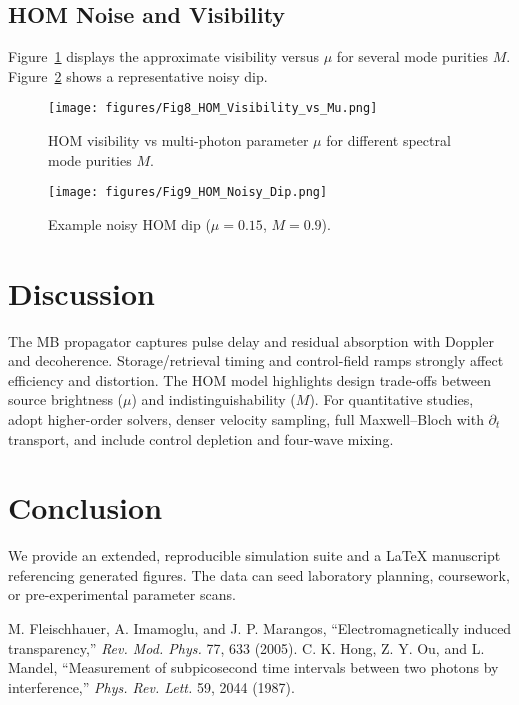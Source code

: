 \documentclass[11pt]{article}
\begin{document}
\subsection{HOM Noise and Visibility}
Figure~\ref{fig:hom_vis} displays the approximate visibility versus $\mu$ for several mode purities $M$. Figure~\ref{fig:hom_noisy} shows a representative noisy dip.

\begin{figure}[h]
\centering
\texttt{[image: figures/Fig8\_HOM\_Visibility\_vs\_Mu.png]}
\caption{HOM visibility vs multi-photon parameter $\mu$ for different spectral mode purities $M$.}
\label{fig:hom_vis}
\end{figure}

\begin{figure}[h]
\centering
\texttt{[image: figures/Fig9\_HOM\_Noisy\_Dip.png]}
\caption{Example noisy HOM dip ($\mu=0.15$, $M=0.9$).}
\label{fig:hom_noisy}
\end{figure}

\section{Discussion}
The MB propagator captures pulse delay and residual absorption with Doppler and decoherence. Storage/retrieval timing and control-field ramps strongly affect efficiency and distortion. The HOM model highlights design trade-offs between source brightness ($\mu$) and indistinguishability ($M$). For quantitative studies, adopt higher-order solvers, denser velocity sampling, full Maxwell--Bloch with $\partial_t$ transport, and include control depletion and four-wave mixing.

\section{Conclusion}
We provide an extended, reproducible simulation suite and a \LaTeX{} manuscript referencing generated figures. The data can seed laboratory planning, coursework, or pre-experimental parameter scans.


\begin{thebibliography}{9}
 M. Fleischhauer, A. Imamoglu, and J. P. Marangos, ``Electromagnetically induced transparency,'' \emph{Rev. Mod. Phys.} 77, 633 (2005).
 C. K. Hong, Z. Y. Ou, and L. Mandel, ``Measurement of subpicosecond time intervals between two photons by interference,'' \emph{Phys. Rev. Lett.} 59, 2044 (1987).
\end{thebibliography}
\end{document}
